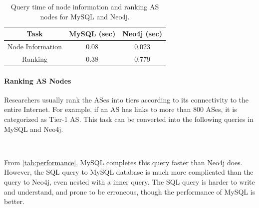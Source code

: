 \documentclass[letterpaper,twocolumn,11pt]{article}
\begin{document}
{\begin{table}
\begin{tabular}{ccc}
\hline
{\bf Task} & {\bf MySQL (sec)} & {\bf Neo4j (sec)}\\
\hline
Node Information & 0.08 & 0.023 \\
Ranking & 0.38 & 0.779 \\
\hline
\end{tabular}
\caption{Query time of node information and ranking AS nodes for MySQL and Neo4j.}
\label{tab:performance}
\end{table}

\paragraph{Ranking AS Nodes} Researchers usually rank the ASes into tiers according to its connectivity to the entire Internet. For example, if an AS has links to more than 800 ASes, it is categorized as Tier-1 AS. This task can be converted into the following queries in MySQL and Neo4j.
\begin{center}
\\
\vspace{6pt}
\end{center}

From \autoref{tab:performance}, MySQL completes this query faster than Neo4j does. However, the SQL query to MySQL database is much more complicated than the query to Neo4j, even nested with a inner query. The SQL query is harder to write and understand, and prone to be erroneous, though the performance of MySQL is better.

}
\end{document}
